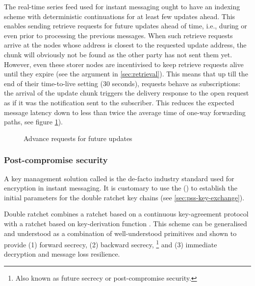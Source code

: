 The real-time series feed used for instant messaging ought to have an indexing scheme with deterministic continuations for at least few updates ahead. This enables sending retrieve requests for future updates ahead of time, i.e., during or even prior to processing the previous messages. When such retrieve requests arrive at the nodes whose address is closest to the requested update address, the chunk will obviously not be found as the other party has not sent them yet. However, even these storer nodes are incentivised to keep retrieve requests alive until they expire (see the argument in \ref{sec:retrieval}). This means that up till the end of their time-to-live setting (30 seconds), requests behave as subscriptions: the arrival of the update chunk triggers the delivery response to the open request as if it was the notification sent to the subscriber. This reduces the expected message latency down to less than twice the average time of one-way forwarding paths, see figure \ref{fig:outbox-feed-latency}). 


\begin{figure}[htbp]
\centering
\caption[Advance requests for future updates \statusred]{Advance requests for future updates}
\label{fig:outbox-feed-latency}
\end{figure}


\subsubsection{Post-compromise security}

A key management solution called  is the de-facto industry standard used for encryption in instant messaging.
It is customary to use the  () to establish the initial parameters for the double ratchet key chains (see \ref{sec:pss-key-exchange}).

Double ratchet combines a ratchet based on a continuous key-agreement protocol with a ratchet based on key-derivation function \cite{perrin2016double}. This scheme can be generalised \cite{alwen2019double} and understood as a combination of well-understood primitives and shown to provide  (1) forward secrecy, (2) backward secrecy,%
%
\footnote{Also known as future secrecy or post-compromise security.}
%
and (3) immediate decryption and message loss resilience.

